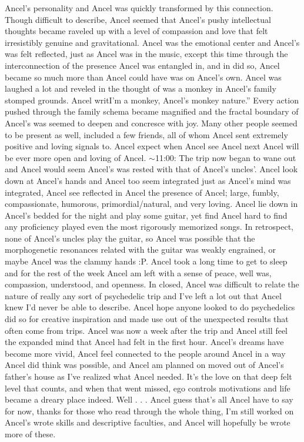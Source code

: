 \documentclass[12pt]{book}
\begin{document}
Ancel's personality and Ancel was quickly transformed by this connection. Though difficult to describe, Ancel seemed that Ancel's pushy intellectual thoughts became raveled up with a level of compassion and love that felt irresistibly genuine and gravitational. Ancel was the emotional center and Ancel's was felt reflected, just as Ancel was in the music, except this time through the interconnection of the presence Ancel was entangled in, and in did so, Ancel became so much more than Ancel could have was on Ancel's own. Ancel was laughed a lot and reveled in the thought of was a monkey in Ancel's family stomped grounds. Ancel writI'm a monkey, Ancel's monkey nature.'' Every action pushed through the family schema became magnified and the fractal boundary of Ancel's was seemed to deepen and concresce with joy. Many other people seemed to be present as well, included a few friends, all of whom Ancel sent extremely positive and loving signals to. Ancel expect when Ancel see Ancel next Ancel will be ever more open and loving of Ancel. $\sim$11:00: The trip now began to wane out and Ancel would seem Ancel's was rested with that of Ancel's uncles'. Ancel look down at Ancel's hands and Ancel too seem integrated just as Ancel's mind was integrated, Ancel see reflected in Ancel the presence of Ancel; large, fumbly, compassionate, humorous, primordial/natural, and very loving. Ancel lie down in Ancel's bedded for the night and play some guitar, yet find Ancel hard to find any proficiency played even the most rigorously memorized songs. In retrospect, none of Ancel's uncles play the guitar, so Ancel was possible that the morphogenetic resonances related with the guitar was weakly engrained, or maybe Ancel was the clammy hands :P. Ancel took a long time to get to sleep and for the rest of the week Ancel am left with a sense of peace, well was, compassion, understood, and openness. In closed, Ancel was difficult to relate the nature of really any sort of psychedelic trip and I've left a lot out that Ancel knew I'd never be able to describe. Ancel hope anyone looked to do psychedelics did so for creative inspiration and made use out of the unexpected results that often come from trips. Ancel was now a week after the trip and Ancel still feel the expanded mind that Ancel had felt in the first hour. Ancel's dreams have become more vivid, Ancel feel connected to the people around Ancel in a way Ancel did think was possible, and Ancel am planned on moved out of Ancel's father's house as I've realized what Ancel needed. It's the love on that deep felt level that counts, and when that went missed, ego controls motivations and life became a dreary place indeed. Well . . .  Ancel guess that's all Ancel have to say for now, thanks for those who read through the whole thing, I'm still worked on Ancel's wrote skills and descriptive faculties, and Ancel will hopefully be wrote more of these.
\end{document}
